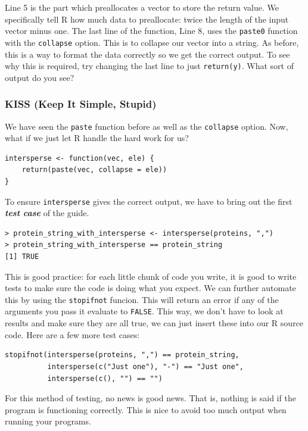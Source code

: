 \documentclass[12pt]{article}
\theoremstyle{remark}
\newcommand{\vocab}[1]{\textbf{\emph{#1}}}
\begin{document}
Line 5 is the part which preallocates a vector to store the return value. We specifically tell R how much data to preallocate: twice the length of the input vector minus one. The last line of the function, Line 8, uses the \verb|paste0| function with the \verb|collapse| option. This is to collapse our vector into a string. As before, this is a way to format the data correctly so we get the correct output. To see why this is required, try changing the last line to just \verb|return(y)|. What sort of output do 
you see?

\subsubsection{KISS (Keep It Simple, Stupid)}
We have seen the \verb|paste| function before as well as the \verb|collapse| option. Now, what if we just let R handle the hard work for us?

\begin{Verbatim}[frame=single, fontsize=\small]
intersperse <- function(vec, ele) {
	return(paste(vec, collapse = ele))
}
\end{Verbatim}

To ensure \verb|intersperse| gives the correct output, we have to bring out the first \vocab{test case} of the guide.
\begin{verbatim}
> protein_string_with_intersperse <- intersperse(proteins, ",")
> protein_string_with_intersperse == protein_string
[1] TRUE
\end{verbatim}

This is good practice: for each little chunk of code you write, it is good to write tests to make sure the code is doing what you expect. We can further automate this by using the \verb|stopifnot| funcion. This will return an error if any of the arguments you pass it evaluate to \verb|FALSE|. This way, we don't have to look at results and make sure they are all true, we can just insert these into our R source code. Here are a few more test cases:

\begin{Verbatim}[frame=single, fontsize=\small]
stopifnot(intersperse(proteins, ",") == protein_string,
          intersperse(c("Just one"), "-") == "Just one",
          intersperse(c(), "") == "")
\end{Verbatim}

For this method of testing, no news is good news. That is, nothing is said if the program is functioning correctly. This is nice to avoid too much output when running your programs.
\end{document}
